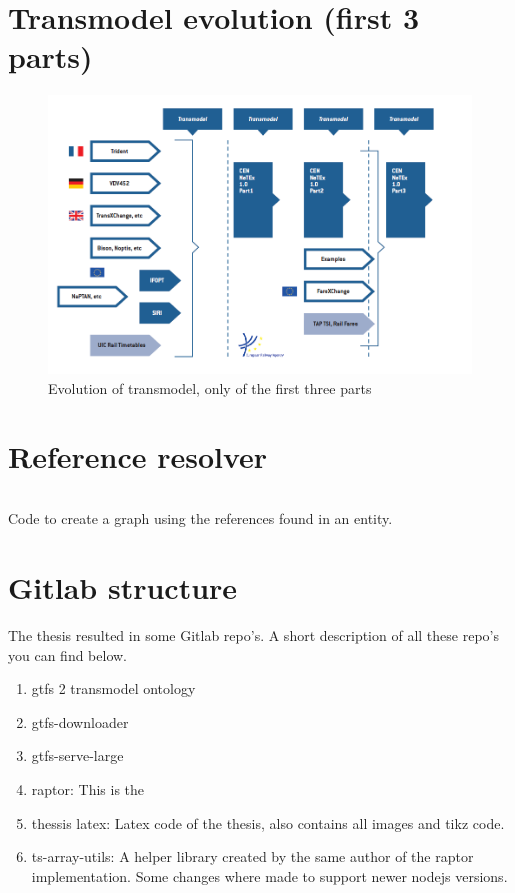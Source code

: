 \begin{appendices}
\section*{Transmodel evolution (first 3 parts)}
\begin{figure}[H]
    \centering
    \includegraphics[width=\textwidth]{images/trans.png}
    \caption{Evolution of transmodel, only of the first three parts}
    \label{fig:evolution:transmodel}
\end{figure}
\section*{Reference resolver}
\begin{listing}[H]
\inputminted[frame=single,linenos,breaklines]{TypeScript}{code/resolve_entities.tex}
\caption{Code to create a graph using the references found in an entity.}
\label{code:resolve}
\end{listing}
\section*{Gitlab structure}
The thesis resulted in some Gitlab repo's. A short description of all these repo's you can find below.
\begin{enumerate}
    \item gtfs 2 transmodel ontology
    \item gtfs-downloader
    \item gtfs-serve-large
    \item raptor: This is the
    \item thessis latex: Latex code of the thesis, also contains all images and tikz code.
    \item ts-array-utils: A helper library created by the same author of the raptor implementation. Some changes where made to support newer nodejs versions.
\end{enumerate}


\end{appendices}
